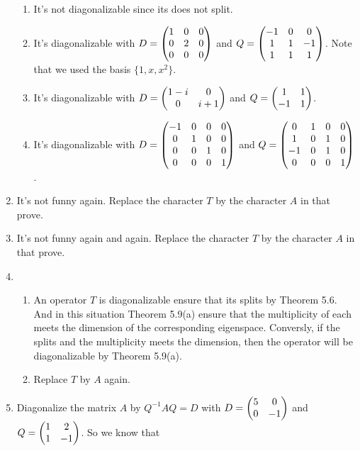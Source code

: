 \begin{enumerate}
\begin{enumerate}
\item It's not diagonalizable since its \charpoly{} does not split.
\item It's diagonalizable with $D=\begin{pmatrix}1 & 0 & 0\cr 0 & 2 & 0\cr 0 & 0 & 0\end{pmatrix}$ and $Q=\begin{pmatrix}-1 & 0 & 0\cr 1 & 1 & -1\cr 1 & 1 & 1\end{pmatrix}$.  Note that we used the basis $\{1, x, x^2\}$.  
\item It's diagonalizable with $D=\begin{pmatrix}1-i & 0\cr 0 & i+1\end{pmatrix}$ and $Q=\begin{pmatrix}1 & 1\cr -1 & 1\end{pmatrix}$.
\item It's diagonalizable with $D=\begin{pmatrix}-1 & 0 & 0 & 0\cr 0 & 1 & 0 & 0\cr 0 & 0 & 1 & 0\cr 0 & 0 & 0 & 1\end{pmatrix}$ and $Q=\begin{pmatrix}0 & 1 & 0 & 0\cr 1 & 0 & 1 & 0\cr -1 & 0 & 1 & 0\cr 0 & 0 & 0 & 1\end{pmatrix}$.
\end{enumerate}
\item It's not funny again. Replace the character $T$ by the character $A$ in that prove.
\item It's not funny again and again. Replace the character $T$ by the character $A$ in that prove.
\item \begin{enumerate}
\item An operator $T$ is diagonalizable ensure that its \charpoly{} splits by Theorem 5.6. And in this situation Theorem 5.9(a) ensure that the multiplicity of each \egva{} meets the dimension of the corresponding eigenspace. Conversly, if the \charpoly{} splits and the multiplicity meets the dimension, then the operator will be diagonalizable by Theorem 5.9(a).
\item Replace $T$ by $A$ again.
\end{enumerate}
\item Diagonalize the matrix $A$ by $Q^{-1}AQ=D$ with $D=\begin{pmatrix}5 & 0\cr 0 & -1\end{pmatrix}$ and $Q=\begin{pmatrix}1 & 2\cr 1 & -1\end{pmatrix}$. So we know that 

\end{enumerate}
